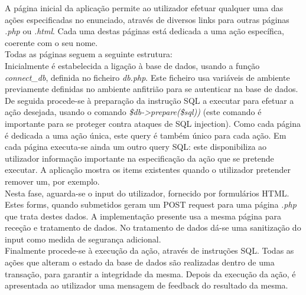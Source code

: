 \documentclass[12pt]{report}
\begin{document}
    \normalsize
    \vspace{2mm}

    \hspace*{1em}
    A página inicial da aplicação permite ao utilizador efetuar qualquer uma das ações especificadas no enunciado, através de diversos links para outras páginas \textit{.php} ou \textit{.html}. Cada uma destas páginas está dedicada a uma ação específica, coerente com o seu nome. \\

    \hspace*{1em} Todas as páginas seguem a seguinte estrutura:
    \\

    \hspace*{1em}Inicialmente é estabelecida a ligação à base de dados, usando a função \textit{connect\_db}, definida no ficheiro \textit{db.php}. Este ficheiro usa variáveis de ambiente previamente definidas no ambiente anfitrião para se autenticar na base de dados.
    \\

    \hspace*{1em} De seguida procede-se à preparação da instrução SQL a executar para efetuar a ação desejada, usando o comando \textit{\$db->prepare(\$sql))} (este comando é importante para se proteger contra ataques de SQL injection). Como cada página é dedicada a uma ação única, este query é também único para cada ação.
    Em cada página executa-se ainda um outro query SQL: este disponibiliza ao utilizador informação importante na especificação da ação que se pretende executar. A aplicação mostra os items existentes quando o utilizador pretender remover um, por exemplo.
    \\

    \hspace*{1em} Nesta fase, aguarda-se o input do utilizador, fornecido por formulários HTML. Estes forms, quando submetidos geram um POST request para uma página \textit{.php} que trata destes dados. A implementação presente usa a mesma página para receção e tratamento de dados. No tratamento de dados dá-se uma sanitização do input como medida de segurança adicional.
    \\

    \hspace*{1em} Finalmente procede-se à execução da ação, através de instruções SQL. Todas as ações que alteram o estado da base de dados são realizadas dentro de uma transação, para garantir a integridade da mesma. Depois da execução da ação, é apresentada ao utilizador uma mensagem de feedback do resultado da mesma.
    \\
\end{document}
